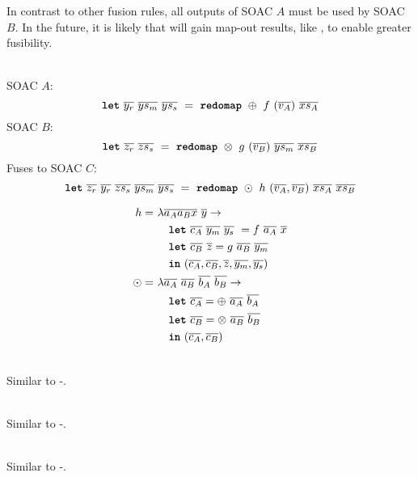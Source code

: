 \begin{description}
  In contrast to other fusion rules, all outputs of SOAC $A$ must be
  used by SOAC $B$.  In the future, it is likely that 
  will gain map-out results, like , to enable greater
  fusibility.

\item[\kw{redomap}-\kw{redomap}]\hfill\\

  SOAC $A$:
  \[
    \mbox{\texttt{\bfseries{let}}}~\overline{y_{r}}~\overline{ys_{m}}~\overline{ys_{s}}~=~\mbox{\texttt{\bfseries{redomap}}}~\oplus~f~(\overline{v_{A}})~\overline{xs_{A}}
  \]
  SOAC $B$:
  \[
    \mbox{\texttt{\bfseries{let}}}~\overline{z_{r}}~\overline{zs_{s}}~=~\mbox{\texttt{\bfseries{redomap}}}~\otimes~g~(\overline{v_{B}})~\overline{ys_{m}}~\overline{xs_{B}}
  \]
  Fuses to SOAC $C$:
  \[
    \mbox{\texttt{\bfseries{let}}}~\overline{z_{r}}~\overline{y_{r}}~\overline{zs_{s}}~\overline{ys_{m}}~\overline{ys_{s}}~=~\mbox{\texttt{\bfseries{redomap}}}~\odot~h~(\overline{v_{A}},\overline{v_{B}})~\overline{xs_{A}}~\overline{xs_{B}}
  \]

  \begin{align*}
    h =~& \lambda \overline{a_{A}} \overline{a_{B}} \overline{x}~\overline{y} \rightarrow \\
      & \quad \mbox{\texttt{\bfseries{let}}}~\overline{c_{A}}~\overline{y_{m}}~\overline{y_{s}}~ = f~\overline{a_{A}}~\overline{x} \\
      & \quad \mbox{\texttt{\bfseries{let}}}~\overline{c_{B}}~\overline{z} = g~\overline{a_{B}}~\overline{y_{m}} \\
        & \quad \mbox{\texttt{\bfseries{in}}}~(\overline{c_{A}},\overline{c_{B}},\overline{z},\overline{y_{m}},\overline{y_{s}}) \\
    \odot =~& \lambda \overline{a_{A}}~\overline{a_{B}}~\overline{b_{A}}~\overline{b_{B}} \rightarrow \\
        & \quad \mbox{\texttt{\bfseries{let}}}~\overline{c_{A}} = \oplus~\overline{a_{A}}~\overline{b_{A}} \\
        & \quad \mbox{\texttt{\bfseries{let}}}~\overline{c_{B}} = \otimes~\overline{a_{B}}~\overline{b_{B}} \\
        & \quad \mbox{\texttt{\bfseries{in}}}~(\overline{c_{A}}, \overline{c_{B}})
  \end{align*}

\item[\kw{redomap}-\kw{map}]\hfill\\

  Similar to -.

\item[\kw{scanomap}-\kw{scanomap}]\hfill\\

  Similar to -.

\item[\kw{scanomap}-\kw{map}]\hfill\\

  Similar to -.


\end{description}
